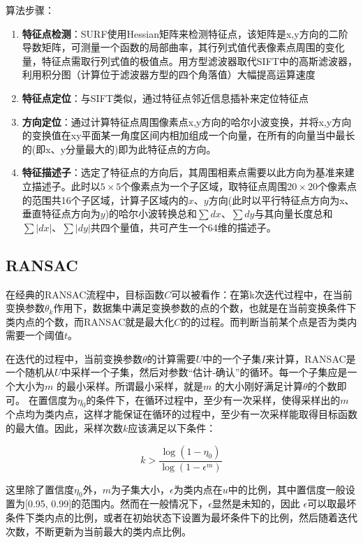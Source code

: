 算法步骤：
\begin{enumerate}
    \item \textbf{特征点检测}：SURF使用Hessian矩阵来检测特征点，该矩阵是x,y方向的二阶导数矩阵，可测量一个函数的局部曲率，其行列式值代表像素点周围的变化量，特征点需取行列式值的极值点。用方型滤波器取代SIFT中的高斯滤波器，利用积分图（计算位于滤波器方型的四个角落值）大幅提高运算速度
    \item \textbf{特征点定位}：与SIFT类似，通过特征点邻近信息插补来定位特征点
    \item \textbf{方向定位}：通过计算特征点周围像素点x,y方向的哈尔小波变换，并将x,y方向的变换值在xy平面某一角度区间内相加组成一个向量，在所有的向量当中最长的(即x、y分量最大的)即为此特征点的方向。
    \item \textbf{特征描述子}：选定了特征点的方向后，其周围相素点需要以此方向为基准来建立描述子。此时以$5\times5$个像素点为一个子区域，取特征点周围$20\times20$个像素点的范围共16个子区域，计算子区域内的$x$、$y$方向(此时以平行特征点方向为x、垂直特征点方向为$y$)的哈尔小波转换总和$\sum dx$、$\sum dy$与其向量长度总和$\sum \vert dx\vert$、$\sum\vert dy\vert$共四个量值，共可产生一个64维的描述子。
\end{enumerate}

\subsection{RANSAC}

在经典的RANSAC流程中，目标函数$C$可以被看作：在第k次迭代过程中，在当前变换参数$\theta_k$作用下，数据集中满足变换参数的点的个数，也就是在当前变换条件下类内点的个数，而RANSAC就是最大化$C$的的过程。而判断当前某个点是否为类内需要一个阈值$t$。

在迭代的过程中，当前变换参数$\theta$的计算需要$U$中的一个子集$ I $来计算，RANSAC是一个随机从$U$中采样一个子集，然后对参数“估计-确认”的循环。每一个子集应是一个大小为$m$ 的最小采样。所谓最小采样，就是$m$ 的大小刚好满足计算$\theta$的个数即可。
在置信度为$\eta_0$的条件下，在循环过程中，至少有一次采样，使得采样出的$m $个点均为类内点，这样才能保证在循环的过程中，至少有一次采样能取得目标函数的最大值。因此，采样次数$k$应该满足以下条件：

$$
    k>\frac{\log(1-\eta_0)}{\log(1-\epsilon^m)}
$$

这里除了置信度$\eta_0$外，$m $为子集大小，$\epsilon$为类内点在$u$中的比例，其中置信度一般设置为[0.95, 0.99]的范围内。然而在一般情况下，$\epsilon$显然是未知的，因此 $\epsilon$可以取最坏条件下类内点的比例，或者在初始状态下设置为最坏条件下的比例，然后随着迭代次数，不断更新为当前最大的类内点比例。


